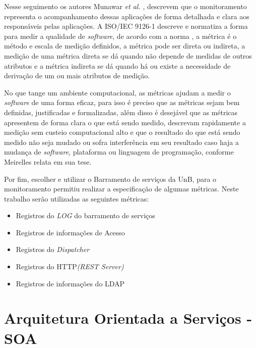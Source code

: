 Nesse seguimento os autores Munawar \textit{et al.} \cite{5298441}, descrevem que o monitoramento representa o acompanhamento dessas aplicações de forma detalhada e clara aos responsáveis pelas aplicações. A ISO/IEC 9126-1 \cite{associaccao2003nbr} descreve e normatiza a forma para medir a qualidade de \textit{software}, de acordo com a norma \cite{associaccao2003nbr}, a métrica é o método e escala de medição definidos, a métrica pode ser direta ou indireta, a medição de uma métrica direta se dá quando não depende de medidas de outros atributos e a métrica indireta se dá quando há ou existe a necessidade de derivação de um ou mais atributos de medição.

No que tange um ambiente computacional, as métricas ajudam a medir o \textit{software} de uma forma eficaz, para isso é preciso que as métricas sejam bem definidas, justificadas e formalizadas, além disso é desejável que as métricas apresentem de forma clara o que está sendo medido, descrevam rapidamente a medição sem custeio computacional alto e que o resultado do que está sendo medido não seja mudado ou sofra interferência em seu resultado caso haja a mudança de \textit{software}, plataforma ou linguagem de programação, conforme Meirelles \cite{meirelles2013monitoramento} relata em sua tese.

Por fim, escolher e utilizar o Barramento de serviços da \acrshort{UnB}, para o monitoramento permitiu  realizar a especificação de algumas métricas. Neste trabalho serão utilizadas as seguintes métricas:

\begin{itemize}
    \item Registros do \textit{LOG} do barramento de serviços
    \item Registros de informações de Acesso 
    \item Registros do \textit{Dispatcher}
    \item Registros do HTTP\textit{(REST Server)}
    \item Registros de informações do LDAP
\end{itemize}




\section{Arquitetura Orientada a Serviços - SOA}

